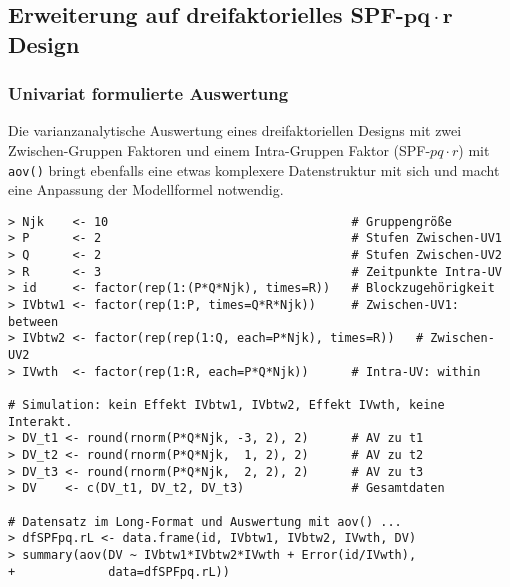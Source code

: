 \subsection[Erweiterung auf dreifaktorielles SPF-\texorpdfstring{$pq \cdot r$}{pq.r} Design]{Erweiterung auf dreifaktorielles SPF-$\bm{pq \cdot r}$ Design}

\subsubsection{Univariat formulierte Auswertung}

Die varianzanalytische Auswertung eines dreifaktoriellen Designs mit zwei Zwischen-Gruppen Faktoren und einem Intra-Gruppen Faktor (SPF-$pq \cdot r$) mit \lstinline!aov()! bringt ebenfalls eine etwas komplexere Datenstruktur mit sich und macht eine Anpassung der Modellformel notwendig.
\begin{lstlisting}
> Njk    <- 10                                  # Gruppengröße
> P      <- 2                                   # Stufen Zwischen-UV1
> Q      <- 2                                   # Stufen Zwischen-UV2
> R      <- 3                                   # Zeitpunkte Intra-UV
> id     <- factor(rep(1:(P*Q*Njk), times=R))   # Blockzugehörigkeit
> IVbtw1 <- factor(rep(1:P, times=Q*R*Njk))     # Zwischen-UV1: between
> IVbtw2 <- factor(rep(rep(1:Q, each=P*Njk), times=R))   # Zwischen-UV2
> IVwth  <- factor(rep(1:R, each=P*Q*Njk))      # Intra-UV: within

# Simulation: kein Effekt IVbtw1, IVbtw2, Effekt IVwth, keine Interakt.
> DV_t1 <- round(rnorm(P*Q*Njk, -3, 2), 2)      # AV zu t1
> DV_t2 <- round(rnorm(P*Q*Njk,  1, 2), 2)      # AV zu t2
> DV_t3 <- round(rnorm(P*Q*Njk,  2, 2), 2)      # AV zu t3
> DV    <- c(DV_t1, DV_t2, DV_t3)               # Gesamtdaten

# Datensatz im Long-Format und Auswertung mit aov() ...
> dfSPFpq.rL <- data.frame(id, IVbtw1, IVbtw2, IVwth, DV)
> summary(aov(DV ~ IVbtw1*IVbtw2*IVwth + Error(id/IVwth),
+             data=dfSPFpq.rL))
\end{lstlisting}

